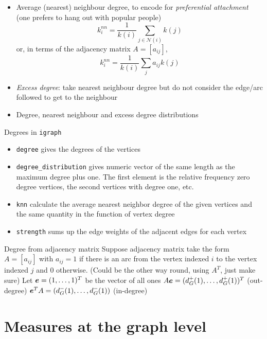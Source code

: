 \documentclass[aspectratio=169]{beamer}\usepackage[]{graphicx}\usepackage[]{xcolor}
\begin{document}
\begin{frame}
	\begin{itemize}
		\item Average (nearest) neighbour degree, to encode for \emph{preferential attachment} (one prefers to hang out with popular people)
		\[
			k_i^{nn} = \frac{1}{k(i)}\sum_{j\in\mathcal{N}(i)}k(j)
		\]
		or, in terms of the adjacency matrix $A=[a_{ij}]$,
		\[
			k_i^{nn} = \frac{1}{k(i)}\sum_{j}a_{ij}k(j)
		\]
		\item \emph{Excess degree}: take nearest neighbour degree but do not consider the edge/arc followed to get to the neighbour
		\item Degree, nearest neighbour and excess degree distributions
	\end{itemize}
\end{frame}


\begin{frame}{Degrees in {\tt igraph}}
	\begin{itemize}
		\item {\tt degree} gives the degrees of the vertices
		\item {\tt degree\_distribution} gives numeric vector of the same length as the maximum degree plus one. The first element is the relative frequency zero degree vertices, the second vertices with degree one, etc.
		\item {\tt knn} calculate the average nearest neighbor degree of the given vertices and the same quantity in the function of vertex degree
		\item {\tt strength} sums up the edge weights of the adjacent edges for each vertex
	\end{itemize}
\end{frame}

\begin{frame}{Degree from adjacency matrix}
	Suppose adjacency matrix take the form $A=[a_{ij}]$ with $a_{ij}=1$ if there is an arc from the vertex indexed $i$ to the vertex indexed $j$ and 0 otherwise. (Could be the other way round, using $A^T$, just make sure)
	\vfill
	Let $\bm{e}=(1,\ldots,1)^T$ be the vector of all ones 
	\vfill
	$A\bm{e}=(d_G^+(1),\ldots,d_G^+(1))^T$ (out-degree)
	\vfill
	$\bm{e}^TA=(d_G^-(1),\ldots,d_G^-(1))$ (in-degree)
\end{frame}


\section{Measures at the graph level}
\end{document}

